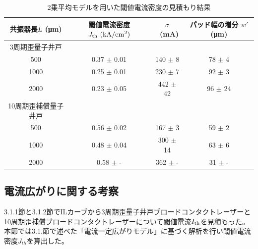 \begin{table}[h]
  \caption{2乗平均モデルを用いた閾値電流密度の見積もり結果}
  \label{table:table_w_prime}
  \centering
  \begin{tabular}{cccc}
    \hline
    共振器長$L$ (\si{\micro\metre})  &  閾値電流密度 $J_{\rm{th}} \ (\si{kA/cm^2})$ &$\sigma$\ (\si{mA})& パッド幅の増分  $w'$ (\si{\micro\metre}) \\
    \hline \hline
    3周期歪量子井戸\\
     500 & 0.37 $\pm$ 0.01 & 140 $\pm$ 8&78 $\pm$ 4\\
    1000  & 0.25 $\pm$ 0.01& 230 $ \pm$ 7&92 $\pm$ 3\\
    2000  & 0.23 $\pm$ 0.05& 442 $ \pm$ 42 &96 $\pm$ 24\\
    10周期歪補償量子井戸\\ 
      500 & 0.56 $\pm$ 0.02& 167 $\pm$ 3 &59 $\pm$ 2\\
    1000  & 0.48 $\pm$ 0.04& 300 $\pm$ 14 &63 $\pm$ 6\\
    2000  & 0.58 $\pm$ - & 362 $\pm$ - &31 $\pm$ -\\ 
    \hline
  \end{tabular}
\end{table}

\subsection{電流広がりに関する考察}%
3.1.1節と3.1.2節でILカーブから3周期歪量子井戸ブロードコンタクトレーザーと10周期歪補償ブロードコンタクトレーザーについて閾値電流$I_{\rm{th}}$を見積もった。本節では3.1.節で述べた「電流一定広がりモデル」に基づく解析を行い閾値電流密度$J_{th}$を算出した。



